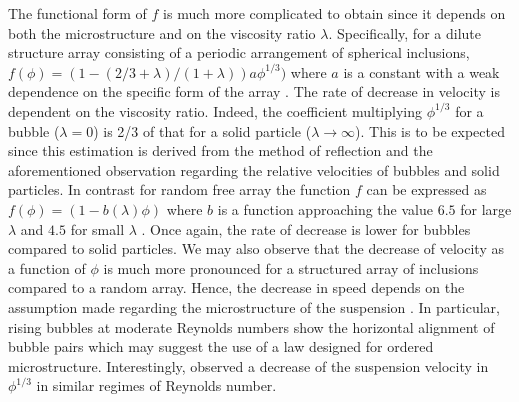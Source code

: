 The functional form of $f$ is much more complicated to obtain since it depends on both the microstructure and on the viscosity ratio $\lambda$. 
Specifically, for a dilute structure array consisting of a periodic arrangement of spherical inclusions, $f(\phi) =(1 - (2/3+\lambda)/(1+\lambda))a\phi^{1/3})$ where $a$ is a constant with a weak dependence on the specific form of the array \citep{sangani1987}. 
The rate of decrease in velocity is dependent on the viscosity ratio. 
Indeed, the coefficient multiplying $\phi^{1/3}$ for a bubble ($\lambda=0$) is 2/3 of that for a solid particle ($\lambda \to \infty$). 
This is to be expected since this estimation is derived from the method of reflection and the aforementioned observation regarding the relative velocities of bubbles and solid particles. In contrast for random free array the function $f$ can be expressed as  $f(\phi) = (1-b(\lambda)\phi)$ where $b$ is a function approaching the value $6.5$ for large $\lambda$ and $4.5$ for small $\lambda$ \citep{wacholder1973,haber1981}. 
Once again, the rate of decrease is lower for bubbles compared to solid particles. 
We may also observe that the decrease of velocity as a function of $\phi$ is much more pronounced for a structured array of inclusions compared to a random array. 
Hence, the decrease in speed depends on the assumption made regarding the microstructure of the suspension \citep{davis1985sedimentation}. In particular, rising bubbles at moderate Reynolds numbers show the horizontal alignment of bubble pairs \citep{bunner2002dynamics,yin2006} which may suggest the use of a law designed for ordered microstructure. 
Interestingly, \citet{loisy2017} observed a decrease of the suspension velocity in $\phi^{1/3}$ in similar regimes of Reynolds number. 


